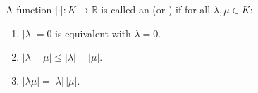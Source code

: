 A function $|\cdot|: K \to \mathbb{R}$ is called an  (or ) if for all $\lambda, \mu \in K$:
\begin{enumerate}
\item[(1)] $|\lambda| = 0$ is equivalent with $\lambda = 0$.
\item[(2)] $|\lambda + \mu| \leq |\lambda| + |\mu|$.
\item[(3)] $|\lambda\mu| = |\lambda|\,|\mu|$.
\end{enumerate}
